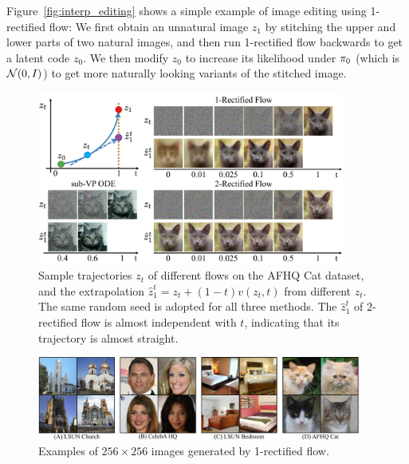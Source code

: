 Figure~\ref{fig:interp_editing} shows a simple example of image editing using 1-rectified flow: 
We first obtain an unnatural image $z_1$ by stitching the upper and lower parts of two natural images, 
and then run 1-rectified flow backwards to get a latent code $z_0$. 
We then modify $z_0$ to increase its likelihood under ${\pi}_0$ (which is $\mathcal{N}(0,I)$) 
to get more naturally looking variants of the stitched image. %




\begin{figure}
    \centering
    \includegraphics[width=0.9\textwidth]{arxiv_figures/cat_target_new.jpeg}
    \caption{
    Sample trajectories $z_t$ of different flows on the AFHQ Cat dataset,  %
    and the extrapolation $\hat{z}_1^t =z_t + (1-t) v(z_t, t)$ from different $z_t$. The same random seed is adopted for all three methods. The $\hat z_1^t$ of 2-rectified flow is almost independent with $t$, indicating that its trajectory is almost straight. 
    }
    \label{fig:cat_target}
\end{figure}


\begin{figure}
    \centering
    \includegraphics[width=0.95\textwidth]{arxiv_figures/highres.jpeg}
    \caption{Examples of $256\times 256$ images generated by 1-rectified flow.}
    \label{fig:high_res}
\end{figure}


